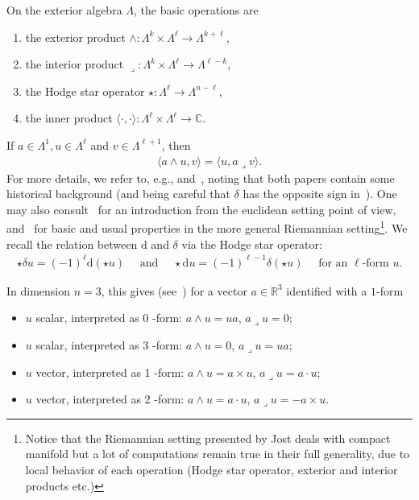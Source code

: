 \documentclass[AHL,Unicode,longabstracts,published]{cedram}
\newcommand{\bbR}{\mathbb{R}}
\newcommand{\bbC}{\mathbb{C}}
\newcommand{\rmd}{\mathrm{d}}
\newcommand*{\romanenumi}{\renewcommand*{\theenumi}{\roman{enumi}}}
\begin{document}
On the exterior algebra $\Lambda$, the basic operations are
\begin{enumerate}\romanenumi
\item the exterior product $\wedge: \Lambda^{k} \times \Lambda^{\ell} \rightarrow \Lambda^{k+\ell}$,
\item the interior product $\lrcorner: \Lambda^{k} \times \Lambda^{\ell} \rightarrow \Lambda^{\ell-k}$,
\item the Hodge star operator $\star: \Lambda^{\ell} \rightarrow \Lambda^{n-\ell}$,
\item the inner product $\langle\cdot, \cdot\rangle: \Lambda^{\ell} \times \Lambda^{\ell} \rightarrow \bbC$.
\end{enumerate}
If $a \in \Lambda^{1}, u \in \Lambda^{\ell}$ and $v \in \Lambda^{\ell+1}$, then
\begin{align*}
\langle a \wedge u, v\rangle=\langle u, a\lrcorner v\rangle.
\end{align*}
For more details, we refer to, e.g., \cite[Section~2]{AxelssonMcIntosh2004} and~\cite[Section~3]{CostabelMcIntosh2010}, noting that both papers contain some historical background (and being careful that ${\delta}$ has the opposite sign in~\cite{AxelssonMcIntosh2004}). One may also consult~\cite{DoCarmo1994} for an introduction from the euclidean setting point of view, and~\cite[Section~1-3]{Jost2011} for basic and usual properties in the more general Riemannian setting\footnote{Notice that the Riemannian setting presented by Jost deals with compact manifold but a lot of computations remain true in their full generality, due to local behavior of each operation (Hodge star operator, exterior and interior products etc.)}. We recall the relation between $\rmd$ and ${\delta}$ via the Hodge star operator:
\begin{align*}
\star {\delta} u=(-1)^{\ell} \rmd(\star u) \quad\text{ and }\quad \star \rmd u=(-1)^{\ell-1} {\delta}(\star u) \quad\text{ for an }\ell\text{-form }u.
\end{align*}

In dimension $n=3$, this gives (see~\cite{CostabelMcIntosh2010}) for a vector $a \in \bbR^{3}$ identified with a $1$-form
\begin{itemize}
\item $u$ scalar, interpreted as 0 -form: $a \wedge u=u a$, $a\lrcorner u=0$;
\item $u$ scalar, interpreted as 3 -form: $a \wedge u=0$, $a\lrcorner u=u a$;
\item $u$ vector, interpreted as 1 -form: $a \wedge u=a \times u$, $a\lrcorner u=a \cdot u$;
\item $u$ vector, interpreted as 2 -form: $a \wedge u=a \cdot u$, $a\lrcorner u=-a \times u$.
\end{itemize}
\end{document}
